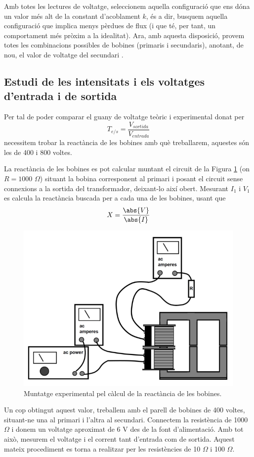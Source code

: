 \documentclass[a4paper,10.5pt]{report}
\begin{document}
Amb totes les lectures de voltatge, seleccionem aquella configuració que ens dóna un valor més alt de la constant d'acoblament $k$, és a dir, busquem aquella configuració que implica menys pèrdues de flux (i que té, per tant, un comportament més pròxim a la idealitat). Ara, amb aquesta disposició, provem totes les combinacions possibles de bobines (primaris i secundaris), anotant, de nou, el valor de voltatge del secundari .

\subsection{Estudi de les intensitats i els voltatges d'entrada i de sortida}
Per tal de poder comparar el guany de voltatge teòric i experimental donat per
\begin{equation}
	T_{e/s}=\frac{V_{sortida}}{V_{entrada}}
	\label{eq4:25}
\end{equation}
necessitem trobar la reactància de les bobines amb què treballarem, aquestes són les de 400 i 800 voltes.

La reactància de les bobines es pot calcular muntant el circuit de la Figura \ref{fig4:4} (on $R=1000$ $\Omega$) situant la bobina corresponent al primari i posant el circuit sense connexions a la sortida del transformador, deixant-lo així obert. Mesurant $I_1$ i $V_1$ es calcula la reactància buscada per a cada una de les bobines, usant que
\begin{equation}
	X = \frac{\abs{V}}{\abs{I}}
	\label{eq4:27}
\end{equation}

\begin{figure}[h]
	\centering
	\includegraphics[width=0.4\linewidth]{screenshot010}
	\caption{Muntatge experimental pel càlcul de la reactància de les bobines.}
	\label{fig4:4}
\end{figure}

Un cop obtingut aquest valor, treballem amb el parell de bobines de 400 voltes, situant-ne una al primari i l'altra al secundari. Connectem la resistència de 1000 $\Omega$ i donem un voltatge aproximat de 6 V des de la font d'alimentació. Amb tot això, mesurem el voltatge i el corrent tant d'entrada com de sortida. Aquest mateix procediment es torna a realitzar per les resistències de 10 $\Omega$ i 100 $\Omega$.
\end{document}
